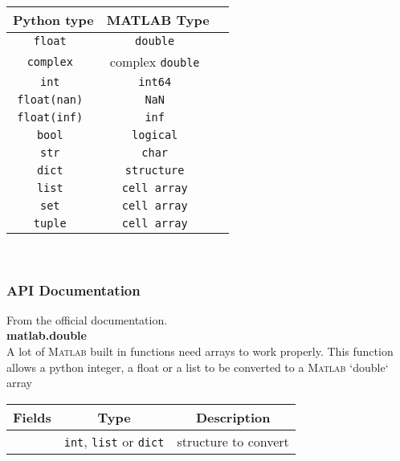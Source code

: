 \begin{table}[h]
    \centering
    \begin{tabular}{|>{\customfont}c|>{\customfont}c|>{\customfont}c|}
        \hline 
        \rowcolor{gray!30}
        \textbf{Python type} & \textbf{MATLAB Type} \\ \hline
        \tt float & \tt double \\ \hline
        \tt complex & complex \tt double \\ \hline 
        \tt int & \tt int64 \\ \hline 
        \tt float(nan) & \tt NaN \\ \hline 
        \tt float(inf) & \tt inf \\ \hline
        \tt bool  & \tt logical \\ \hline 
        \tt str   & \tt char \\ \hline 
        \tt dict  & \tt structure \\ \hline 
        \tt list  & \tt cell array \\ \hline 
        \tt set   & \tt cell array \\ \hline 
        \tt tuple & \tt cell array \\ \hline 
    \end{tabular}
\end{table}
\ 
\subsubsection{API Documentation}

From the official documentation.\\

\textbf{matlab.double}\\

A lot of \textsc{Matlab} built in functions need arrays to work properly. This function allows a python integer, a float or a list to be converted to a \textsc{Matlab} `double` array

\begin{table}[H]
    \centering
    \begin{tabular}{|>{\customfont}c|>{\customfont}c|>{\customfont}c|}
        \hline 
        \rowcolor{gray!30}
        \textbf{Fields} & \textbf{Type} & \textbf{Description}\\ \hline
        {\tt struct} & {\tt int}, {\tt list} or {\tt dict} & structure to convert \\ \hline
    \end{tabular}
\end{table}
\

